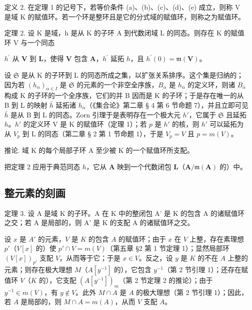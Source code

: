 定义 2. 在定理 1 的记号下，若等价条件 (a)、(b)、(c)、(d)、(e) 成立，则称 V 是域 K 的赋值环。若一个环是整环且是它的分式域的赋值环，则称之为赋值环。

定理 2. 设 K 是域，h 是从 K 的子环 A 到代数闭域 L 的同态。则存在 K 的赋值环 V 与一个同态

\(h^{\prime}\) 从 \(\mathbf{V}\) 到 \(\mathbf{L}\)，使得 \(\mathbf{V}\) 包含 \(\mathbf{A}\)，\(h^{\prime}\) 延拓 \(h\)，且 \(h^{\prime}(0) = \mathfrak{m}(\mathbf{V})\)。

设 \(\mathfrak{S}\) 是从 K 的子环到 L 的同态所成之集，以扩张关系排序。这个集是归纳的；因为若 \((h_{\alpha})_{\alpha \in I}\) 是 \(\mathfrak{S}\) 的元素的一个非空全序族，\(B_{\alpha}\) 是 \(h_{\alpha}\) 的定义环，则诸 \(B_{\alpha}\) 构成 K 的子环的一个全序族，它们的并 B 因而是 K 的子环；于是存在唯一的从 B 到 L 的映射 \(\bar{h}\) 延拓诸 \(h_{\alpha}\)（《集合论》第二章 § 4 第 6 节命题 7），并且立即可见 \(\bar{h}\) 是从 B 到 L 的同态。Zorn 引理于是表明存在一个极大元 \(h'\)，它属于 \(\mathfrak{S}\) 且延拓 \(h\)。\(h'\) 的定义环 V 是 K 的赋值环（定理 1）；若 \(p\) 是 \(h'\) 的核，则 \(h'\) 可以延拓为从 \(V_p\) 到 L 的同态（第二章 § 2 第 1 节命题 1），于是 \(V_p = V\) 且 \(p = m(V)\)。

推论. 域 K 的每个局部子环 A 至少被 K 的一个赋值环所支配。

把定理 2 应用于典范同态 \(h\)，它从 \(\mathbf{A}\) 映到一个代数闭包 \(\mathbf{L}\)（\(\mathbf{A} / \mathfrak{m}(\mathbf{A})\) 的）中。

\subsection{整元素的刻画}

定理 3. 设 A 是域 K 的子环。A 在 K 中的整闭包 A' 是 K 的包含 A 的诸赋值环之交；若 A 是局部的，则 A' 是 K 的支配 A 的诸赋值环之交。

设 \(x\) 是 \(A'\) 的元素，\(V\) 是 \(K\) 的包含 \(A\) 的赋值环；由于 \(x\) 在 \(V\) 上整，存在素理想 \(p'\)（\(V[x]\) 的）使 \(p' \cap V = m(V)\)（第五章 §2 第 1 节定理 1）；显然局部环 \((V[x])_{p'}\) 支配 \(V\)，从而等于它；于是 \(x \in V\)。反之，设 \(y\) 是 \(K\) 的不在 \(A\) 上整的元素；则存在极大理想 \(M\)（\(A[y^{-1}]\) 的），它包含 \(y^{-1}\)（第 2 节引理 1）；还存在赋值环 \(V\)（\(K\) 的），它支配 \((A[y^{-1}])_{m}\)（第 2 节定理 2 的推论）；由于 \(y^{-1} \in m(V)\)，有 \(y \notin V\)。此外 \(M \cap A\) 是 \(A\) 的极大理想（第 2 节引理 1）；因此，若 \(A\) 是局部的，则 \(M \cap A = m(A)\)，从而 \(V\) 支配 \(A\)。

